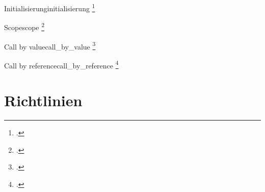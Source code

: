 \begin{Definition}{Initialisierung}{initialisierung}
  \footcite{thiemann_einfuhrung_2018}
\end{Definition}

\begin{Definition}{Scope}{scope}
  \footcite{thiemann_einfuhrung_2018}
\end{Definition}

\begin{Definition}{Call by value}{call_by_value}
  \footcite{bast_programmieren_2020}
\end{Definition}

\begin{Definition}{Call by reference}{call_by_reference}
  \footcite{bast_programmieren_2020}
\end{Definition}


\section{Richtlinien}
